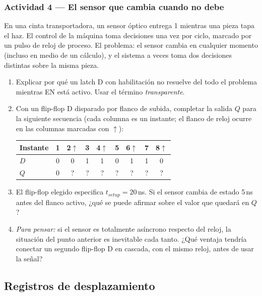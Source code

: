 \subsubsection*{Actividad 4 --- El sensor que cambia cuando no debe}

En una cinta transportadora, un sensor óptico entrega 1 mientras una pieza tapa el haz. El control de la máquina toma decisiones una vez por ciclo, marcado por un pulso de reloj de proceso. El problema: el sensor cambia en cualquier momento (incluso en medio de un cálculo), y el sistema a veces toma dos decisiones distintas sobre la misma pieza.

\begin{enumerate}[label=\alph*)]
    \item Explicar por qué un latch D con habilitación no resuelve del todo el problema mientras EN está activo. Usar el término \textit{transparente}.
    \item Con un flip-flop D disparado por flanco de subida, completar la salida $Q$ para la siguiente secuencia (cada columna es un instante; el flanco de reloj ocurre en las columnas marcadas con $\uparrow$):

\begin{table}[H]
\centering
\begin{tabular}{lcccccccc}
\toprule
Instante & 1 & 2$\uparrow$ & 3 & 4$\uparrow$ & 5 & 6$\uparrow$ & 7 & 8$\uparrow$ \\
\midrule
$D$ & 0 & 0 & 1 & 1 & 0 & 1 & 1 & 0 \\
$Q$ & 0 & ? & ? & ? & ? & ? & ? & ? \\
\bottomrule
\end{tabular}
\end{table}

    \item El flip-flop elegido especifica $t_{setup} = 20$\,ns. Si el sensor cambia de estado 5\,ns antes del flanco activo, ¿qué se puede afirmar sobre el valor que quedará en $Q$?
    \item \textit{Para pensar:} si el sensor es totalmente asíncrono respecto del reloj, la situación del punto anterior es inevitable cada tanto. ¿Qué ventaja tendría conectar un segundo flip-flop D en cascada, con el mismo reloj, antes de usar la señal?
\end{enumerate}

\subsection{Registros de desplazamiento}


